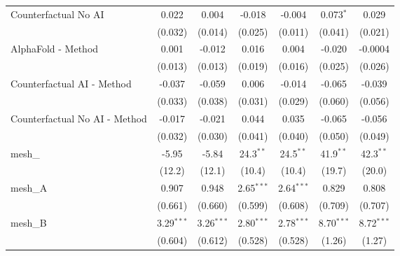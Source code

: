 \begin{tabular}{lcccccc}
   Counterfactual No AI                                        & 0.022         & 0.004         & -0.018        & -0.004        & 0.073$^{*}$   & 0.029\\   
                                                               & (0.032)       & (0.014)       & (0.025)       & (0.011)       & (0.041)       & (0.021)\\   
   AlphaFold - Method                                          & 0.001         & -0.012        & 0.016         & 0.004         & -0.020        & -0.0004\\   
                                                               & (0.013)       & (0.013)       & (0.019)       & (0.016)       & (0.025)       & (0.026)\\   
   Counterfactual AI - Method                                  & -0.037        & -0.059        & 0.006         & -0.014        & -0.065        & -0.039\\   
                                                               & (0.033)       & (0.038)       & (0.031)       & (0.029)       & (0.060)       & (0.056)\\   
   Counterfactual No AI - Method                               & -0.017        & -0.021        & 0.044         & 0.035         & -0.065        & -0.056\\   
                                                               & (0.032)       & (0.030)       & (0.041)       & (0.040)       & (0.050)       & (0.049)\\   
   mesh\_                                                      & -5.95         & -5.84         & 24.3$^{**}$   & 24.5$^{**}$   & 41.9$^{**}$   & 42.3$^{**}$\\   
                                                               & (12.2)        & (12.1)        & (10.4)        & (10.4)        & (19.7)        & (20.0)\\   
   mesh\_A                                                     & 0.907         & 0.948         & 2.65$^{***}$  & 2.64$^{***}$  & 0.829         & 0.808\\   
                                                               & (0.661)       & (0.660)       & (0.599)       & (0.608)       & (0.709)       & (0.707)\\   
   mesh\_B                                                     & 3.29$^{***}$  & 3.26$^{***}$  & 2.80$^{***}$  & 2.78$^{***}$  & 8.70$^{***}$  & 8.72$^{***}$\\   
                                                               & (0.604)       & (0.612)       & (0.528)       & (0.528)       & (1.26)        & (1.27)\\   

\end{tabular}
